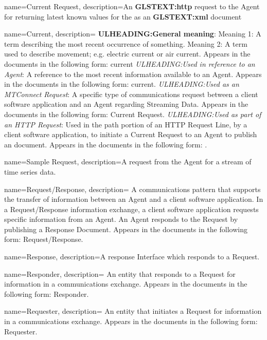 {
    name={Current Request},
	description={An \textbf{GLSTEXT:http} request to the \gls{Agent} for returning latest known values for the  as an  \textbf{GLSTEXT:xml} document}
}

{
    name={Current},
	description={
	\textbf{ULHEADING:General meaning}:
	Meaning 1:  A term describing the most recent occurrence of something.
	Meaning 2:  A term used to describe movement; e.g. electric current or air current.
	Appears in the documents in the following form: current
	\textit{ULHEADING:Used in reference to an \gls{Agent}}:
	A reference to the most recent information available to an \gls{Agent}.
	Appears in the documents in the following form: current.
	\textit{ULHEADING:Used as an \gls{MTConnect Request}}:
	A specific type of communications request between a client software application and an \gls{Agent} regarding \gls{Streaming Data}.  
	Appears in the documents in the following form: \gls{Current Request}.
	\textit{ULHEADING:Used as part of an \gls{HTTP Request}}:
	Used in the path portion of an \gls{HTTP Request Line}, by a client software application, to initiate a \gls{Current Request} to an \gls{Agent} to publish an  document.
	Appears in the documents in the following form: .
}
}

{
    name={Sample Request},
	description={A request from the \gls{Agent} for a stream of time series data.}
}

{
    name={Request/Response},
	description={
	A communications pattern that supports the transfer of information between an \gls{Agent} and a client software application. In a \gls{Request/Response} information exchange, a client software application requests specific information from an \gls{Agent}. An \gls{Agent} responds to the \gls{Request} by publishing a \gls{Response Document}.   
	Appears in the documents in the following form: \gls{Request/Response}.
}
}

{
    name={Response},
	description={A response \gls{Interface} which responds to a \gls{Request}.}
}

{
    name={Responder},
	description={
	An entity that responds to a \gls{Request} for information in a communications exchange.
	Appears in the documents in the following form: \gls{Responder}.
}
}

{
    name={Requester},
	description={
	An entity that initiates a \gls{Request} for information in a communications exchange.
	Appears in the documents in the following form: \gls{Requester}.
}
}

